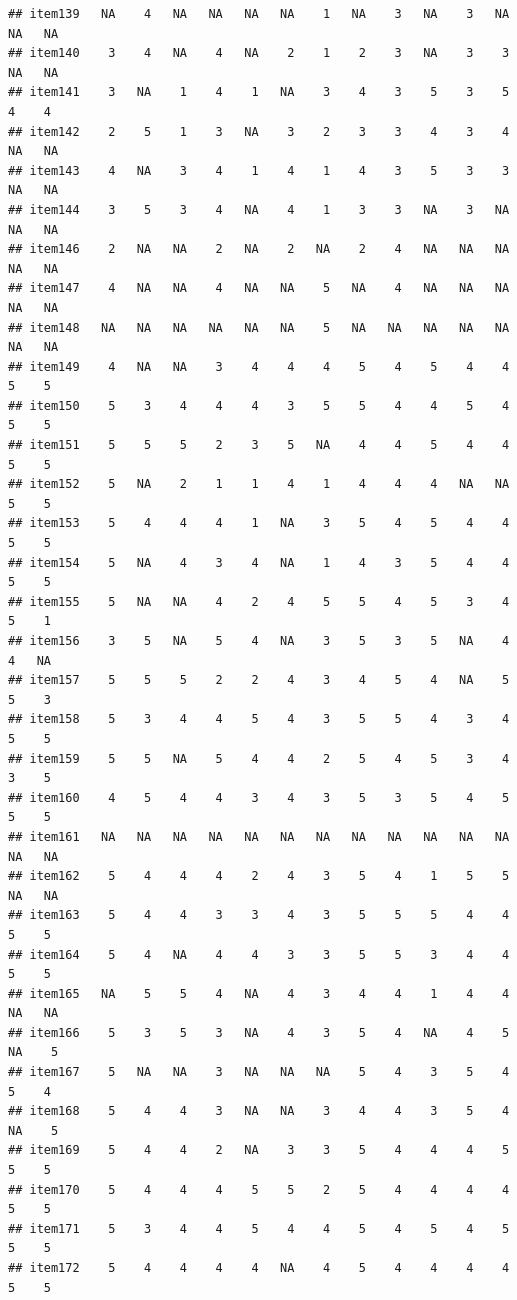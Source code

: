 \documentclass[
  man]{apa6}
\begin{document}
\begin{verbatim}
## item139   NA    4   NA   NA   NA   NA    1   NA    3   NA    3   NA   NA   NA
## item140    3    4   NA    4   NA    2    1    2    3   NA    3    3   NA   NA
## item141    3   NA    1    4    1   NA    3    4    3    5    3    5    4    4
## item142    2    5    1    3   NA    3    2    3    3    4    3    4   NA   NA
## item143    4   NA    3    4    1    4    1    4    3    5    3    3   NA   NA
## item144    3    5    3    4   NA    4    1    3    3   NA    3   NA   NA   NA
## item146    2   NA   NA    2   NA    2   NA    2    4   NA   NA   NA   NA   NA
## item147    4   NA   NA    4   NA   NA    5   NA    4   NA   NA   NA   NA   NA
## item148   NA   NA   NA   NA   NA   NA    5   NA   NA   NA   NA   NA   NA   NA
## item149    4   NA   NA    3    4    4    4    5    4    5    4    4    5    5
## item150    5    3    4    4    4    3    5    5    4    4    5    4    5    5
## item151    5    5    5    2    3    5   NA    4    4    5    4    4    5    5
## item152    5   NA    2    1    1    4    1    4    4    4   NA   NA    5    5
## item153    5    4    4    4    1   NA    3    5    4    5    4    4    5    5
## item154    5   NA    4    3    4   NA    1    4    3    5    4    4    5    5
## item155    5   NA   NA    4    2    4    5    5    4    5    3    4    5    1
## item156    3    5   NA    5    4   NA    3    5    3    5   NA    4    4   NA
## item157    5    5    5    2    2    4    3    4    5    4   NA    5    5    3
## item158    5    3    4    4    5    4    3    5    5    4    3    4    5    5
## item159    5    5   NA    5    4    4    2    5    4    5    3    4    3    5
## item160    4    5    4    4    3    4    3    5    3    5    4    5    5    5
## item161   NA   NA   NA   NA   NA   NA   NA   NA   NA   NA   NA   NA   NA   NA
## item162    5    4    4    4    2    4    3    5    4    1    5    5   NA   NA
## item163    5    4    4    3    3    4    3    5    5    5    4    4    5    5
## item164    5    4   NA    4    4    3    3    5    5    3    4    4    5    5
## item165   NA    5    5    4   NA    4    3    4    4    1    4    4   NA   NA
## item166    5    3    5    3   NA    4    3    5    4   NA    4    5   NA    5
## item167    5   NA   NA    3   NA   NA   NA    5    4    3    5    4    5    4
## item168    5    4    4    3   NA   NA    3    4    4    3    5    4   NA    5
## item169    5    4    4    2   NA    3    3    5    4    4    4    5    5    5
## item170    5    4    4    4    5    5    2    5    4    4    4    4    5    5
## item171    5    3    4    4    5    4    4    5    4    5    4    5    5    5
## item172    5    4    4    4    4   NA    4    5    4    4    4    4    5    5

\end{verbatim}
\end{document}
